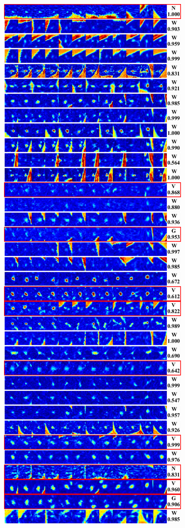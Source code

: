 \documentclass[onecolumn]{IEEEtran}
\begin{document}
\begin{figure}[H]
{\includegraphics[width=0.45\columnwidth]{./images/elcap-colornodules-iso1}
}
\end{figure}
\end{document}
